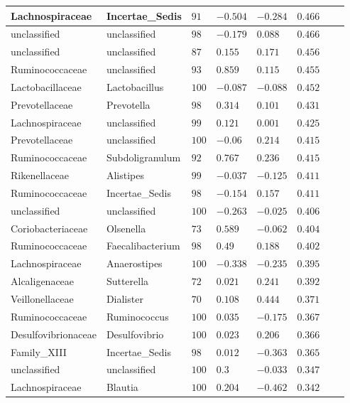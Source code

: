 \begin{table}[!ht]
\begin{tiny}
\begin{tabular}{|l|l|l|l|l|l|l|l|}
Lachnospiraceae & Incertae_Sedis & $91$ & $-0.504$ & $-0.284$ & $0.466$ \\ \hline
unclassified & unclassified & $98$ & $-0.179$ & $0.088$ & $0.466$ \\ \hline
unclassified & unclassified & $87$ & $0.155$ & $0.171$ & $0.456$ \\ \hline
Ruminococcaceae & unclassified & $93$ & $0.859$ & $0.115$ & $0.455$ \\ \hline
Lactobacillaceae & Lactobacillus & $100$ & $-0.087$ & $-0.088$ & $0.452$ \\ \hline
Prevotellaceae & Prevotella & $98$ & $0.314$ & $0.101$ & $0.431$ \\ \hline
Lachnospiraceae & unclassified & $99$ & $0.121$ & $0.001$ & $0.425$ \\ \hline
Prevotellaceae & unclassified & $100$ & $-0.06$ & $0.214$ & $0.415$ \\ \hline
Ruminococcaceae & Subdoligranulum & $92$ & $0.767$ & $0.236$ & $0.415$ \\ \hline
Rikenellaceae & Alistipes & $99$ & $-0.037$ & $-0.125$ & $0.411$ \\ \hline
Ruminococcaceae & Incertae_Sedis & $98$ & $-0.154$ & $0.157$ & $0.411$ \\ \hline
unclassified & unclassified & $100$ & $-0.263$ & $-0.025$ & $0.406$ \\ \hline
Coriobacteriaceae & Olsenella & $73$ & $0.589$ & $-0.062$ & $0.404$ \\ \hline
Ruminococcaceae & Faecalibacterium & $98$ & $0.49$ & $0.188$ & $0.402$ \\ \hline
Lachnospiraceae & Anaerostipes & $100$ & $-0.338$ & $-0.235$ & $0.395$ \\ \hline
Alcaligenaceae & Sutterella & $72$ & $0.021$ & $0.241$ & $0.392$ \\ \hline
Veillonellaceae & Dialister & $70$ & $0.108$ & $0.444$ & $0.371$ \\ \hline
Ruminococcaceae & Ruminococcus & $100$ & $0.035$ & $-0.175$ & $0.367$ \\ \hline
Desulfovibrionaceae & Desulfovibrio & $100$ & $0.023$ & $0.206$ & $0.366$ \\ \hline
Family_XIII & Incertae_Sedis & $98$ & $0.012$ & $-0.363$ & $0.365$ \\ \hline
unclassified & unclassified & $100$ & $0.3$ & $-0.033$ & $0.347$ \\ \hline
Lachnospiraceae & Blautia & $100$ & $0.204$ & $-0.462$ & $0.342$ \\ \hline

\end{tabular}
\end{tiny}
\end{table}
